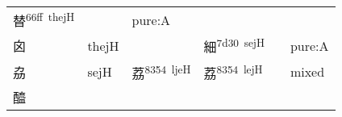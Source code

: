 \documentclass[14pt,a4paper]{scrartcl}
\begin{document}
\begin{longtable}[c]{@{}llllll@{}}
\begin{minipage}[t]{0.14\columnwidth}
替\textsuperscript{66ff~thejH}
\strut\end{minipage} &
\begin{minipage}[t]{0.14\columnwidth}\raggedright\strut
\strut\end{minipage} &
\begin{minipage}[t]{0.14\columnwidth}\raggedright\strut
pure:A
\strut\end{minipage}\tabularnewline
\begin{minipage}[t]{0.14\columnwidth}\raggedright\strut
囟
\strut\end{minipage} &
\begin{minipage}[t]{0.14\columnwidth}\raggedright\strut
thejH
\strut\end{minipage} &
\begin{minipage}[t]{0.14\columnwidth}\raggedright\strut
\strut\end{minipage} &
\begin{minipage}[t]{0.14\columnwidth}\raggedright\strut
細\textsuperscript{7d30~sejH}
\strut\end{minipage} &
\begin{minipage}[t]{0.14\columnwidth}\raggedright\strut
\strut\end{minipage} &
\begin{minipage}[t]{0.14\columnwidth}\raggedright\strut
pure:A
\strut\end{minipage}\tabularnewline
\begin{minipage}[t]{0.14\columnwidth}\raggedright\strut
劦
\strut\end{minipage} &
\begin{minipage}[t]{0.14\columnwidth}\raggedright\strut
sejH
\strut\end{minipage} &
\begin{minipage}[t]{0.14\columnwidth}\raggedright\strut
荔\textsuperscript{8354~ljeH}
\strut\end{minipage} &
\begin{minipage}[t]{0.14\columnwidth}\raggedright\strut
荔\textsuperscript{8354~lejH}
\strut\end{minipage} &
\begin{minipage}[t]{0.14\columnwidth}\raggedright\strut
\strut\end{minipage} &
\begin{minipage}[t]{0.14\columnwidth}\raggedright\strut
mixed
\strut\end{minipage}\tabularnewline
\begin{minipage}[t]{0.14\columnwidth}\raggedright\strut
醯
\strut\end{minipage} &

\end{longtable}
\end{document}
